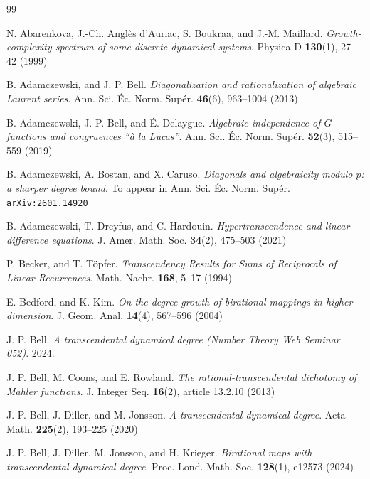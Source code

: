 \documentclass[11pt,a4paper]{article}
\theoremstyle{plain}
\theoremstyle{remark}
\theoremstyle{custombold}
\begin{document}

\begin{thebibliography}{99}

 N. Abarenkova, J.-Ch. {Anglès d’Auriac}, S. Boukraa, and J.-M. Maillard. \textit{Growth-complexity spectrum of some discrete dynamical systems}. Physica D \textbf{130}(1), 27--42 (1999)

 B. Adamczewski, and J. P. Bell. \textit{Diagonalization and rationalization of algebraic Laurent series}. Ann. Sci. \'Ec. Norm. Sup\'er. \textbf{46}(6), 963--1004 (2013)

 B. Adamczewski, J. P. Bell, and \'E. Delaygue. \textit{Algebraic independence of $G$-functions and congruences ``\`a la Lucas''}. Ann. Sci. \'Ec. Norm. Sup\'er. \textbf{52}(3), 515--559 (2019)

 B. Adamczewski, A. Bostan, and X. Caruso. \textit{Diagonals and algebraicity modulo $p$: a sharper degree bound}. To appear in Ann. Sci. \'Ec. Norm. Sup\'er. \texttt{arXiv:2601.14920}


 B. Adamczewski, T. Dreyfus, and C. Hardouin. \textit{Hypertranscendence and linear difference equations}. J. Amer. Math. Soc. \textbf{34}(2), 475--503 (2021)

 P. Becker, and T. T\"{o}pfer. \textit{Transcendency Results for Sums of Reciprocals of Linear Recurrences}. Math. Nachr. \textbf{168}, 5--17 (1994)

 E. Bedford, and K. Kim. \textit{On the degree growth of birational mappings in higher dimension}. J. Geom. Anal. \textbf{14}(4), 567--596 (2004)

 J. P. Bell. \textit{A transcendental dynamical degree (Number Theory Web Seminar 052)}. 2024.

 J. P. Bell, M. Coons, and E. Rowland. \textit{The rational-transcendental dichotomy of Mahler functions}. J. Integer Seq. \textbf{16}(2), article 13.2.10 (2013)


 J. P. Bell, J. Diller, and M. Jonsson. \textit{A transcendental dynamical degree}. Acta Math. \textbf{225}(2), 193--225 (2020)

 J. P. Bell, J. Diller, M. Jonsson, and H. Krieger. \textit{Birational maps with transcendental dynamical degree}. Proc. Lond. Math. Soc. \textbf{128}(1), e12573 (2024)




\end{thebibliography}
\end{document}
